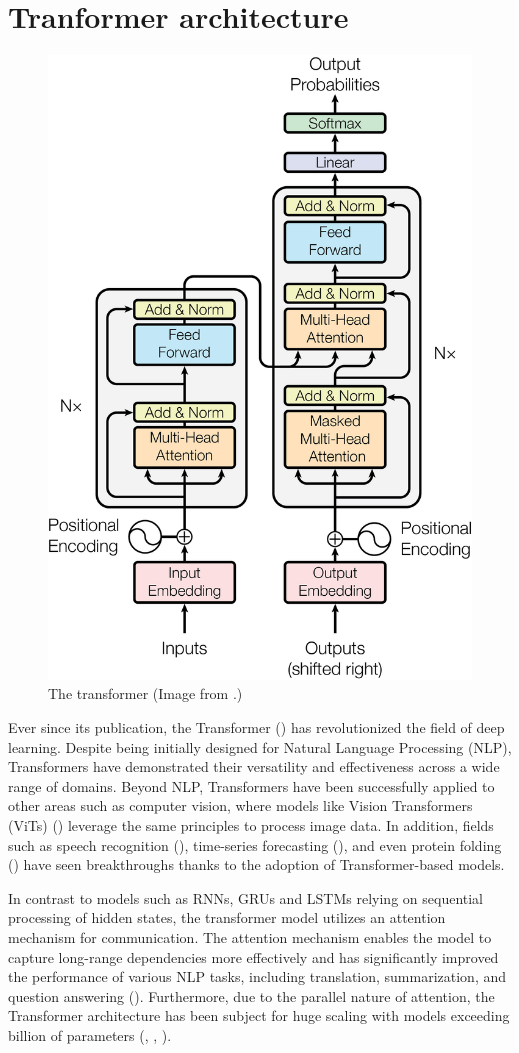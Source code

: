 \section{Tranformer architecture}
\begin{figure}[H]
    \centering
    \includegraphics[width=0.4\linewidth]{figures/transformer.png}
    \caption{The transformer (Image from \cite{transformer2017}.)}
    \label{fig:transformer}
\end{figure}
Ever since its publication, the Transformer (\cite{transformer2017}) has revolutionized the field of deep learning. Despite being initially designed for Natural Language Processing (NLP), Transformers have demonstrated their versatility and effectiveness across a wide range of domains. Beyond NLP, Transformers have been successfully applied to other areas such as computer vision, where models like Vision Transformers (ViTs) (\cite{dosovitskiy2020vit}) leverage the same principles to process image data. In addition, fields such as speech recognition (\cite{conformer2020}), time-series forecasting (\cite{haoyietal-informer-2021}), and even protein folding (\cite{Jumper2021}) have seen breakthroughs thanks to the adoption of Transformer-based models. 

In contrast to models such as RNNs, GRUs and LSTMs relying on sequential processing of hidden states, the transformer model utilizes an attention mechanism for communication. The attention mechanism enables the model to capture long-range dependencies more effectively and has significantly improved the performance of various NLP tasks, including translation, summarization, and question answering (\cite{devlin2018bert}). Furthermore, due to the parallel nature of attention, the Transformer architecture has been subject for huge scaling with models exceeding billion of parameters (\cite{radford_language_2019}, \cite{touvron2023llama2openfoundation}, \cite{anil2023palm2technicalreport}). 

